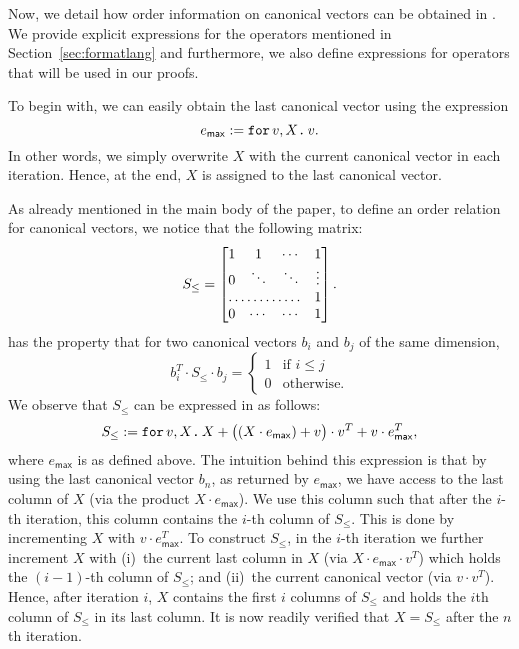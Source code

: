 Now, we detail how order information on canonical vectors can be obtained in \langfor.
We provide explicit expressions for the operators mentioned in Section~\ref{sec:formatlang}
and furthermore, we also define expressions for operators that will be used in our proofs.

To begin with, we can easily obtain the last canonical vector using the expression 
$$
e_{\mathsf{max}} := \texttt{for}\, v,X \texttt{.}\, v.
$$ 
In other words, we simply overwrite $X$ with the current canonical vector in each iteration.
Hence, at the end, $X$ is assigned to the last canonical vector.

%
As already mentioned in the main body of the paper,
to define an order relation for canonical vectors, we notice that the following matrix:
\[
S_{\leq} = \begin{bmatrix}
    1 & 1 & \cdots &  1 \\
    0 & \ddots & \ddots & \vdots \\
    \hdotsfor{3} & 1 \\
    0 & \cdots & \cdots & 1 
\end{bmatrix}.
\]
has the property that for two canonical vectors $b_i$ and $b_j$ of the same dimension, 
$$b_i^T\cdot S_{\leq} \cdot b_j=\begin{cases}1 & \text{if $i\leq j$}\\
0 &\text{otherwise}.
\end{cases}
$$
We observe that $S_{\leq}$ can be expressed in \langfor as 
follows:
$$
S_{\leq}:=\texttt{for}\, v,X \texttt{.}\, X + \bigl((X\cdot e_{\mathsf{max}}) + v \bigr)\cdot v^T + v\cdot e^T_{\mathsf{max}},
$$
where $e_{\mathsf{max}}$ is as defined above. 
The intuition behind this expression is that by using the last canonical vector $b_n$, as returned by $e_{\mathsf{max}}$, we have access to the last column of $X$ (via the product $X\cdot e_{\mathsf{max}}$). We use this column such that after the $i$-th iteration, this column contains the $i$-th column of $S_{\leq}$. This is done by incrementing $X$ with $v\cdot e_{\mathsf{max}}^T$.
To construct $S_{\leq}$, in the $i$-th iteration we further increment $X$ with 
(i)~the current last column in $X$ (via $X\cdot e_{\mathsf{max}}\cdot v^T$) which holds
the $(i-1)$-th column of $S_{\leq}$; and (ii)~the current canonical vector (via $v\cdot v^T$). Hence, after iteration $i$, $X$ contains the first $i$ columns of $S_{\leq}$ and holds the $i$th column of $S_{\leq}$ in its last column. It is now readily verified that $X=S_{\leq}$ after the $n$th iteration.
%
%

